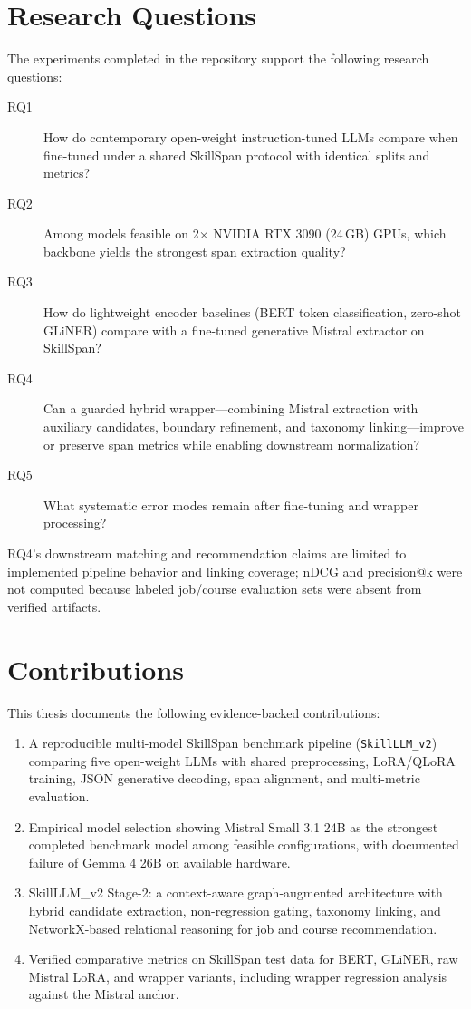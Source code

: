 \section{Research Questions}

The experiments completed in the repository support the following research questions:

\begin{description}
  \item[RQ1] How do contemporary open-weight instruction-tuned LLMs compare when fine-tuned under a shared SkillSpan protocol with identical splits and metrics?
  \item[RQ2] Among models feasible on 2$\times$ NVIDIA RTX 3090 (24\,GB) GPUs, which backbone yields the strongest span extraction quality?
  \item[RQ3] How do lightweight encoder baselines (BERT token classification, zero-shot GLiNER) compare with a fine-tuned generative Mistral extractor on SkillSpan?
  \item[RQ4] Can a guarded hybrid wrapper---combining Mistral extraction with auxiliary candidates, boundary refinement, and taxonomy linking---improve or preserve span metrics while enabling downstream normalization?
  \item[RQ5] What systematic error modes remain after fine-tuning and wrapper processing?
\end{description}

RQ4's downstream matching and recommendation claims are limited to implemented pipeline behavior and linking coverage; nDCG and precision@k were not computed because labeled job/course evaluation sets were absent from verified artifacts.

\section{Contributions}

This thesis documents the following evidence-backed contributions:

\begin{enumerate}
  \item A reproducible multi-model SkillSpan benchmark pipeline (\texttt{SkillLLM\_v2}) comparing five open-weight LLMs with shared preprocessing, LoRA/QLoRA training, JSON generative decoding, span alignment, and multi-metric evaluation.
  \item Empirical model selection showing Mistral Small 3.1 24B as the strongest completed benchmark model among feasible configurations, with documented failure of Gemma 4 26B on available hardware.
  \item SkillLLM\_v2 Stage-2: a context-aware graph-augmented architecture with hybrid candidate extraction, non-regression gating, taxonomy linking, and NetworkX-based relational reasoning for job and course recommendation.
  \item Verified comparative metrics on SkillSpan test data for BERT, GLiNER, raw Mistral LoRA, and wrapper variants, including wrapper regression analysis against the Mistral anchor.
\end{enumerate}


